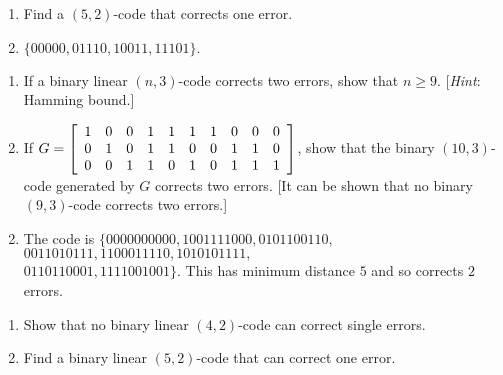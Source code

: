 \begin{multicols}{2}
\begin{ex}
\begin{enumerate}[label={\alph*.}]
\item Find a $(5, 2)$-code that corrects one error.

\end{enumerate}
\begin{sol}
\begin{enumerate}[label={\alph*.}]
\setcounter{enumi}{1}
\item  $\{00000, 01110, 10011, 11101\}.$

\end{enumerate}
\end{sol}
\end{ex}


\begin{ex}
\begin{enumerate}[label={\alph*.}]
\item If a binary linear $(n, 3)$-code corrects two errors, show that $n \geq 9$. [\textit{Hint}: Hamming bound.]

\item If $G = \left[ \begin{array}{rrrrrrrrrr}
1 & 0 & 0 & 1 & 1 & 1 & 1 & 0 & 0 & 0 \\
0 & 1 & 0 & 1 & 1 & 0 & 0 & 1 & 1 & 0 \\
0 & 0 & 1 & 1 & 0 & 1 & 0 & 1 & 1 & 1
\end{array}\right]$, show that the binary $(10, 3)$-code generated by $G$ corrects two errors. [It can be shown that no binary $(9, 3)$-code corrects two errors.]

\end{enumerate}
\begin{sol}
\begin{enumerate}[label={\alph*.}]
\setcounter{enumi}{1}
\item  The code is $\{0000000000, 1001111000, 0101100110,$ \\ $ 0011010111, 1100011110, 1010101111,$ \\ $ 0110110001, 1111001001\}$. This has minimum distance $5$ and so corrects $2$ errors.

\end{enumerate}
\end{sol}
\end{ex}

\begin{ex}
\begin{enumerate}[label={\alph*.}]
\item Show that no binary linear $(4, 2)$-code can correct single errors.

\item Find a binary linear $(5, 2)$-code that can correct one error.


\end{enumerate}
\end{ex}
\end{multicols}
